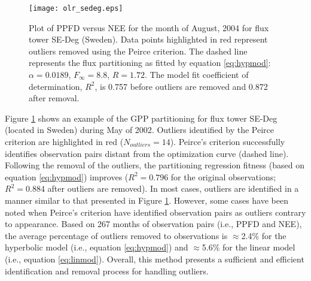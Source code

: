 \begin{figure}[h!]
    \texttt{[image: olr\_sedeg.eps]}
    \caption{Plot of PPFD versus NEE for the month of August, 2004 for flux 
    tower SE-Deg (Sweden). Data points highlighted in red represent outliers 
    removed using the Peirce criterion. The dashed line represents the flux 
    partitioning as fitted by equation \ref{eq:hypmod}: $\alpha = 0.0189$, 
    $F_{\infty} = 8.8$, $R = 1.72$. The model fit coefficient of determination, 
    $R^{2}$, is 0.757 before outliers are removed and 0.872 after removal.}
    \label{fig:outlier}
\end{figure}

\noindent Figure \ref{fig:outlier} shows an example of the GPP partitioning for flux tower SE-Deg (located in Sweden) during May of 2002.  
Outliers identified by the Peirce criterion are highlighted in red ($N_{outliers} = 14$).  
Peirce's criterion successfully identifies observation pairs distant from the optimization curve (dashed line).  
Following the removal of the outliers, the partitioning regression fitness (based on equation \ref{eq:hypmod}) improves ($R^{2} = 0.796$ for the original observations; $R^{2} = 0.884$ after outliers are removed).  
In most cases, outliers are identified in a manner similar to that presented in Figure \ref{fig:outlier}.  
However, some cases have been noted when Peirce's criterion have identified observation pairs as outliers contrary to appearance.  
Based on 267 months of observation pairs (i.e., PPFD and NEE), the average percentage of outliers removed to observations is $\approx$2.4\% for the hyperbolic model (i.e., equation \ref{eq:hypmod}) and $\approx$5.6\% for the linear model (i.e., equation \ref{eq:linmod}).  
Overall, this method presents a sufficient and efficient identification and removal process for handling outliers. 

